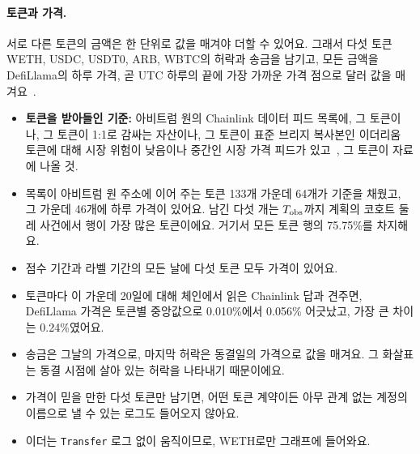\paragraph{토큰과 가격.}
서로 다른 토큰의 금액은 한 단위로 값을 매겨야 더할 수 있어요. 그래서 다섯 토큰 WETH, USDC, USDT0, ARB, WBTC의 허락과 송금을 남기고, 모든 금액을 DefiLlama의 하루 가격, 곧 UTC 하루의 끝에 가장 가까운 가격 점으로 달러 값을 매겨요~\cite{defillamanddocs}.
\begin{itemize}
\item \textbf{토큰을 받아들인 기준:} 아비트럼 원의 Chainlink 데이터 피드 목록에, 그 토큰이나, 그 토큰이 1:1로 감싸는 자산이나, 그 토큰이 표준 브리지 복사본인 이더리움 토큰에 대해 시장 위험이 낮음이나 중간인 시장 가격 피드가 있고~\cite{chainlinknddatafeeds}, 그 토큰이 자료에 나올 것.
\item 목록이 아비트럼 원 주소에 이어 주는 토큰 133개 가운데 64개가 기준을 채웠고, 그 가운데 46개에 하루 가격이 있어요. 남긴 다섯 개는 $T_{\mathrm{obs}}$까지 계획의 코호트 둘레 사건에서 행이 가장 많은 토큰이에요. 거기서 모든 토큰 행의 75.75\%를 차지해요.
\item 점수 기간과 라벨 기간의 모든 날에 다섯 토큰 모두 가격이 있어요.
\item 토큰마다 이 가운데 20일에 대해 체인에서 읽은 Chainlink 답과 견주면, DefiLlama 가격은 토큰별 중앙값으로 0.010\%에서 0.056\% 어긋났고, 가장 큰 차이는 0.24\%였어요.
\item 송금은 그날의 가격으로, 마지막 허락은 동결일의 가격으로 값을 매겨요. 그 화살표는 동결 시점에 살아 있는 허락을 나타내기 때문이에요.
\item 가격이 믿을 만한 다섯 토큰만 남기면, 어떤 토큰 계약이든 아무 관계 없는 계정의 이름으로 낼 수 있는 로그도 들어오지 않아요.
\item 이더는 \texttt{Transfer} 로그 없이 움직이므로, WETH로만 그래프에 들어와요.
\end{itemize}

